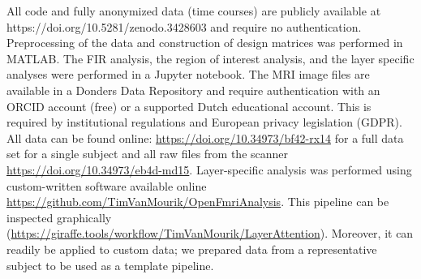 \documentclass[9pt,lineno]{aperture}
\begin{document}
All code and fully anonymized data (time courses) are publicly available at https://doi.org/10.5281/zenodo.3428603 and require no authentication. Preprocessing of the data and construction of design matrices was performed in MATLAB. The FIR analysis, the region of interest analysis, and the layer specific analyses were performed in a Jupyter notebook.
The MRI image files are available in a Donders Data Repository and require authentication with an ORCID account (free) or a supported Dutch educational account. This is required by institutional regulations and European privacy legislation (GDPR). All data can be found online: \url{https://doi.org/10.34973/bf42-rx14} for a full data set for a single subject and all raw files from the scanner \url{https://doi.org/10.34973/eb4d-md15}. Layer-specific analysis was performed using custom-written software available online \url{https://github.com/TimVanMourik/OpenFmriAnalysis}. This pipeline can be inspected graphically \citep{VanMourik2018} (\url{https://giraffe.tools/workflow/TimVanMourik/LayerAttention}). Moreover, it can readily be applied to custom data; we prepared data from a representative subject to be used as a template pipeline.

\end{document}
